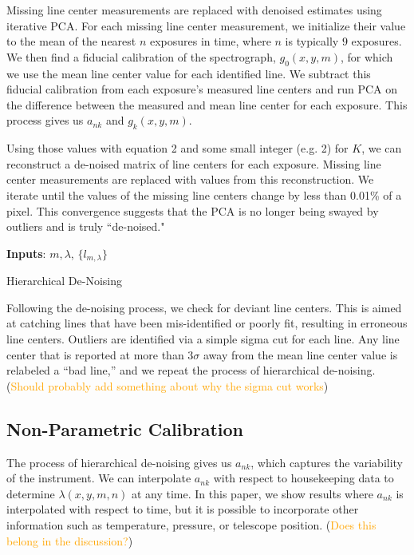 \documentclass[12pt, letterpaper]{article}
\newcommand{\lz}[1]{\textcolor{orange}{#1}}
\begin{document}
Missing line center measurements are replaced with denoised estimates using iterative PCA.  For each missing line center measurement, we initialize their value to the mean of the nearest $n$ exposures in time, where $n$ is typically $9$ exposures.  We then find a fiducial calibration of the spectrograph,  $g_0(x,y,m)$, for which we use the mean line center value for each identified line.  We subtract this fiducial calibration from each exposure's measured line centers and run PCA on the difference between the measured and mean line center for each exposure.  This process gives us $a_{nk}$ and $g_k(x,y,m)$.

Using those values with equation 2 and some small integer (e.g. 2) for $K$, we can reconstruct a de-noised matrix of line centers for each exposure.  Missing line center measurements are replaced with values from this reconstruction.  We iterate until the values of the missing line centers change by less than 0.01\% of a pixel.  This convergence suggests that the PCA is no longer being swayed by outliers and is truly ``de-noised."

\begin{algorithm}
\SetAlgoLined
\textbf{Inputs}: ${m,\lambda}$, $\{l_{m,\lambda}\}$ \;
\caption{Hierarchical De-Noising}
\end{algorithm}

Following the de-noising process, we check for deviant line centers.  This is aimed at catching lines that have been mis-identified or poorly fit, resulting in erroneous line centers.  Outliers are identified via a simple sigma cut for each line.  Any line center that is reported at more than $3\sigma$ away from the mean line center value is relabeled a ``bad line,'' and we repeat the process of hierarchical de-noising. (\lz{Should probably add something about why the sigma cut works})

\subsection{Non-Parametric Calibration} \label{sec:nonparam}
The process of hierarchical de-noising gives us $a_{nk}$, which captures the variability of the instrument.  We can interpolate $a_{nk}$ with respect to housekeeping data to determine $\lambda(x,y,m,n)$ at any time.  In this paper, we show results where $a_{nk}$ is interpolated with respect to time, but it is possible to incorporate other information such as temperature, pressure, or telescope position. (\lz{Does this belong in the discussion?})
\end{document}
